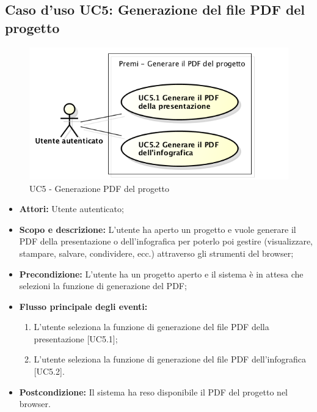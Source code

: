 \subsection{Caso d'uso UC5: Generazione del file PDF del progetto}
\begin{figure}[h] 
	\centering 
	\includegraphics[scale=0.45] {img/UC5.png}
	\caption{UC5 - Generazione PDF del progetto} 
\end{figure}

\begin{itemize}
	\item \textbf{Attori:} Utente autenticato;
	\item \textbf{Scopo e descrizione:} L'utente ha aperto un progetto e vuole generare il PDF della presentazione o dell'\gls{infografica} per poterlo poi gestire (visualizzare, stampare, salvare, condividere, ecc.) attraverso gli strumenti del \gls{browser};
	\item \textbf{Precondizione:} L'utente ha un progetto aperto e il sistema è in attesa che selezioni la funzione di generazione del PDF;
	\item \textbf{Flusso principale degli eventi:}
	\begin{enumerate}
		\item L'utente seleziona la funzione di generazione del file PDF della presentazione [UC5.1];
		\item L'utente seleziona la funzione di generazione del file PDF dell'\gls{infografica} [UC5.2].
	\end{enumerate}
	\item \textbf{Postcondizione:} Il sistema ha reso disponibile il PDF del progetto nel \gls{browser}.
\end{itemize}

